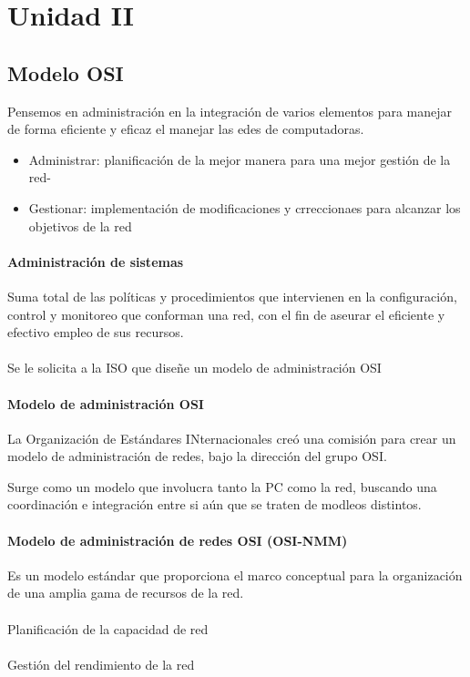\chapter{Unidad II}
\section{Modelo OSI}
Pensemos en administración en la integración de varios elementos para manejar de forma eficiente y eficaz el manejar las edes de computadoras.

\begin{itemize}
    \item {Administrar: planificación de la mejor manera para una mejor gestión de la red-}
    \item {Gestionar: implementación de modificaciones y crreccionaes para alcanzar los objetivos de la red}
\end{itemize}

\subsubsection{Administración de sistemas}
Suma total de las políticas y procedimientos que intervienen en la configuración, control y monitoreo que conforman una red, con el fin de aseurar el eficiente y efectivo empleo de sus recursos. \\\\

Se le solicita a la ISO que diseñe un modelo de administración OSI 

\subsubsection{Modelo de administración OSI}

La Organización de Estándares INternacionales creó una comisión para crear un modelo de administración de redes, bajo la dirección del grupo OSI.

Surge como un modelo que involucra tanto la PC como la red, buscando una coordinación e integración entre si aún que se traten de modleos distintos.

\subsubsection{Modelo de administración de redes OSI (OSI-NMM)}
Es un modelo estándar que proporciona el marco conceptual para la organización de una amplia gama de recursos de la red.\\\\
Planificación de la capacidad de red\\\\
Gestión del rendimiento de la red\\

